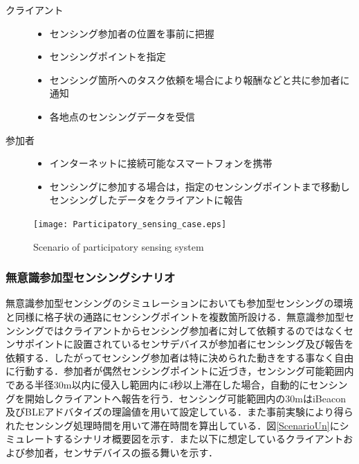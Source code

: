 \documentclass[submit,techrep]{ipsj}
\begin{document}
\begin{description}
 \item[クライアント]\mbox{}
    \begin{itemize}
      \item センシング参加者の位置を事前に把握
      \item センシングポイントを指定
      \item センシング箇所へのタスク依頼を場合により報酬などと共に参加者に通知
      \item 各地点のセンシングデータを受信\\
    \end{itemize}
 \item[参加者]\mbox{}
    \begin{itemize}
      \item インターネットに接続可能なスマートフォンを携帯
      \item センシングに参加する場合は，指定のセンシングポイントまで移動しセンシングしたデータをクライアントに報告
    \end{itemize}
\end{description}

\begin{figure}[t]
 \begin{center}
  \texttt{[image: Participatory\_sensing\_case.eps]}
 \end{center}
 \caption{Scenario of participatory sensing system}
 \label{ScenarioPa}
\end{figure}


\subsubsection{無意識参加型センシングシナリオ}
無意識参加型センシングのシミュレーションにおいても参加型センシングの環境と同様に格子状の通路にセンシングポイントを複数箇所設ける．無意識参加型センシングではクライアントからセンシング参加者に対して依頼するのではなくセンサポイントに設置されているセンサデバイスが参加者にセンシング及び報告を依頼する．したがってセンシング参加者は特に決められた動きをする事なく自由に行動する．参加者が偶然センシングポイントに近づき，センシング可能範囲内である半径30m以内に侵入し範囲内に4秒以上滞在した場合，自動的にセンシングを開始しクライアントへ報告を行う．センシング可能範囲内の30mはiBeacon及びBLEアドバタイズの理論値を用いて設定している．また事前実験により得られたセンシング処理時間を用いて滞在時間を算出している．図\ref{ScenarioUn}にシミュレートするシナリオ概要図を示す．また以下に想定しているクライアントおよび参加者，センサデバイスの振る舞いを示す．\\%
\end{document}
